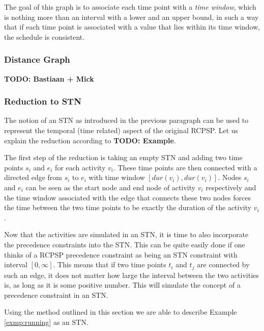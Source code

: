 \documentclass{article}
\theoremstyle{definition}
\newcommand{\TODO}[1]{{\color{red}\textbf{TODO: #1}}}
\newcommand{\dur}[1]{\ensuremath{dur(v_{#1})}} %
\begin{document}
The goal of this graph is to associate each time point with a \emph{time window}, which is nothing more than an interval with a lower and an upper bound, in such a way that if each time point is associated with a value that lies within its time window, the schedule is consistent.

\subsubsection{Distance Graph}



\TODO{Bastiaan + Mick}

\subsubsection{Reduction to STN}
The notion of an STN as introduced in the previous paragraph can be used to represent the temporal (time related) aspect of the original RCPSP. Let us explain the reduction according to \TODO{Example}.

The first step of the reduction is taking an empty STN and adding two time points $s_i$ and $e_i$ for each activity $v_i$. 
These time points are then connected with a directed edge from $s_i$ to $e_i$ with time window $[\dur{i}, \dur{i}]$. 
Nodes $s_i$ and $e_i$ can be seen as the start node and end node of activity $v_i$ respectively and the time window associated with the edge that connects these two nodes forces the time between the two time points to be exactly the duration of the activity $v_i$.

Now that the activities are simulated in an STN, it is time to also incorporate the precedence constraints into the STN. This can be quite easily done if one thinks of a RCPSP precedence constraint as being an STN constraint with interval $[0,\infty]$. This means that if two time points $t_i$ and $t_j$ are connected by such an edge, it does not matter how large the interval between the two activities is, as long as it is some positive number. This will simulate the concept of a precedence constraint in an STN.

Using the method outlined in this section we are able to describe Example \ref{exmp:running} as an STN.
\end{document}
